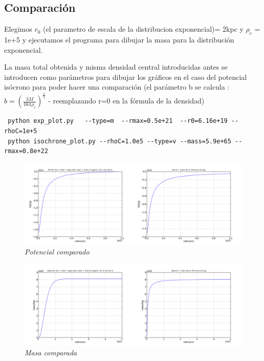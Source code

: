 \documentclass[12pt]{book}
\begin{document}
\subsection*{Comparación}
\begin{description}
\item Elegimos $r_0$ (el parametro de escala de la distribucion exponencial)= 2kpc y $\rho_c$ = 1e+5 y ejecutamos el programa para dibujar la masa para la distribución exponencial. 
\item La masa total obtenida y misma densidad central introducidas antes se introducen como parámetros para dibujar los gráficos en el caso del potencial isócrono para poder hacer una comparación (el parámetro b se calcula : $b = (\frac{3 M}{16 \pi \rho_c})^{\frac{1}{3}}$ -  reemplazando r=0 en la fórmula de la densidad)
\end{description}

\begin{verbatim}
 python exp_plot.py   --type=m  --rmax=0.5e+21  --r0=6.16e+19 --rhoC=1e+5
 python isochrone_plot.py --rhoC=1.0e5 --type=v --mass=5.9e+65 --rmax=0.8e+22
\end{verbatim}

\begin{figure}[!ht]
 \centering
 \includegraphics[scale=0.3]{potAnComp.png}
 \caption{\emph{Potencial comparado}}
\end{figure}

\begin{figure}[!ht]
 \centering
 \includegraphics[scale=0.3]{massAnComp.png}
 \caption{\emph{Masa comparada}}
\end{figure}
\end{document}
